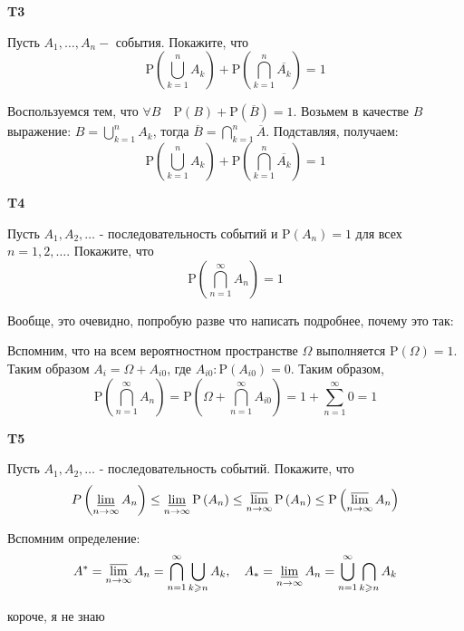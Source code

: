\documentclass[a4paper,12pt]{article} %
\begin{document}
\begin{example}\textbf{T3}

Пусть $A_{1}, \ldots, A_{n}-$ события. Покажите, что
$$
\mathrm{P}\left(\bigcup_{k=1}^{n} A_{k}\right)+\mathrm{P}\left(\bigcap_{k=1}^{n} \overline{A_{k}}\right)=1
$$

Воспользуемся тем, что $\forall B \quad \mathrm{P}(B)+\mathrm{P}(\overline{B})=1$. 
Возьмем в качестве $B$ выражение: $B=\bigcup_{k=1}^n A_k$, тогда 
$\overline{B}=\bigcap_{k=1}^n\overline{A}$.
Подставляя, получаем:
$$
\mathrm{P}\left(\bigcup_{k=1}^{n} A_{k}\right)+\mathrm{P}\left(\bigcap_{k=1}^{n} \overline{A_{k}}\right)=1
$$


\end{example}




\begin{example}\textbf{T4}

Пусть $A_{1}, A_{2}, \ldots$ - последовательность событий и $\mathrm{P}\left(A_{n}\right)=1$ для всех $n=1,2, \ldots .$ Покажите, что
$$
\mathrm{P}\left(\bigcap_{n=1}^{\infty} A_{n}\right)=1
$$

Вообще, это очевидно, попробую разве что написать подробнее, почему это так:

Вспомним, что на всем вероятностном пространстве $\Omega$ выполняется $ \mathrm{P}(\Omega)=1.$ 
Таким образом $A_i=\Omega+A_{i0}$, где $ A_{i0}: \mathrm{P}(A_{i0})=0$.
Таким образом, 
$$
\mathrm{P}\left(\bigcap_{n=1}^{\infty} A_{n}\right)=
\mathrm{P}\left(\Omega+\bigcap_{n=1}^{\infty} A_{i0}\right)=
1+\sum_{n=1}^{\infty} 0=1
$$








\end{example}


\begin{example}\textbf{T5}

Пусть $A_{1}, A_{2}, \ldots$ - последовательность событий. Покажите, что
$$
P\left(\varliminf_{n \rightarrow \infty} A_{n}\right) \leq 
\varliminf_{n \rightarrow \infty} \mathrm{P}\left(A_{n}\right) \leq 
\varlimsup_{n \rightarrow \infty} \mathrm{P}\left(A_{n}\right) \leq 
\mathrm{P}\left(\varlimsup_{n \rightarrow \infty} A_{n}\right)
$$

Вспомним определение:
\[ 
A^{*}=\varlimsup_{n \rightarrow \infty} A_{n}=
\bigcap_{n=1}^{\infty} \bigcup_{k \geqslant n} A_{k}, \quad 
A_{*}=\varliminf_{n \rightarrow \infty} A_{n}=\bigcup_{n=1}^{\infty} \bigcap_{k \geqslant n} A_{k} 
\]


короче, я не знаю




\end{example}
\end{document}
